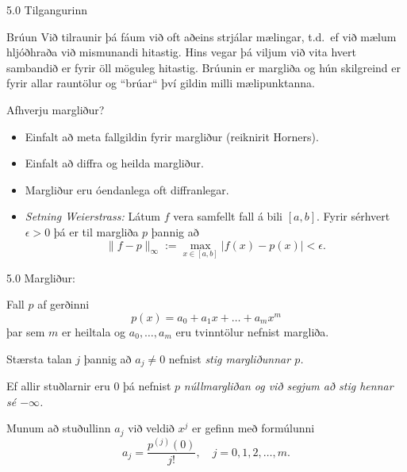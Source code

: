 \begin{frame}{5.0 Tilgangurinn}
 \begin{block}{Brúun}
  Við tilraunir þá fáum við oft aðeins strjálar mælingar, t.d.~ef við mælum hljóðhraða 
  við mismunandi hitastig. \pause Hins vegar þá viljum við vita hvert sambandið er fyrir öll möguleg 
  hitastig.
  Brúunin er margliða og hún skilgreind er fyrir allar rauntölur og ``brúar`` því gildin milli 
  mælipunktanna.
 \end{block}

\pause

  \begin{block}{Afhverju margliður?}
   \begin{itemize}
    \item Einfalt að meta fallgildin fyrir margliður (reiknirit Horners). \pause
    \item Einfalt að diffra og heilda margliður. \pause
    \item Margliður eru óendanlega oft diffranlegar.\pause
    \item \emph{Setning Weierstrass:}
    Látum $f$ vera samfellt fall á bili $[a,b]$. Fyrir sérhvert $\epsilon > 0$ þá
    er til margliða $p$ þannig að 
    $$
      \|f-p\|_\infty := \max_{x\in [a,b]} |f(x)-p(x)| < \epsilon.
    $$
 \end{itemize}
  \end{block}
\end{frame}
%
\begin{frame}{5.0 Margliður:} 

Fall $p$ af gerðinni
\begin{equation*}
	p(x) = a_0 + a_1 x + \ldots + a_m x^m
\end{equation*}
þar sem $m$ er heiltala og $a_0, \ldots, a_m$ eru tvinntölur 
nefnist margliða. 

\pause
\smallskip
Stærsta talan $j$ þannig að $a_j \not= 0$ 
nefnist \em stig \em margliðunnar $p$. 


\pause
\smallskip
Ef allir stuðlarnir 
eru 0 þá nefnist $p$ \em núllmargliðan \em og við segjum að 
stig hennar sé $-\infty$. 

\pause
\smallskip
Munum að stuðullinn $a_j$ við veldið 
$x^j$ er gefinn með formúlunni
\begin{equation*}
	a_j = \frac{p^{(j)}(0)}{j!}, \quad j = 0,1,2,\ldots,m.
\end{equation*} 
\end{frame}

